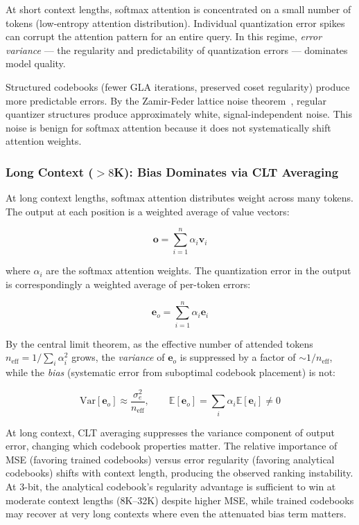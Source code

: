 \documentclass{article}
\newcommand{\E}{\mathbb{E}}
\newcommand{\Var}{\mathrm{Var}}
\begin{document}
At short context lengths, softmax attention is concentrated on a small number of
tokens (low-entropy attention distribution). Individual quantization error
spikes can corrupt the attention pattern for an entire query. In this regime,
\emph{error variance} — the regularity and predictability of quantization
errors — dominates model quality.

Structured codebooks (fewer GLA iterations, preserved coset regularity) produce
more predictable errors. By the Zamir-Feder lattice noise
theorem~\cite{zamir1996lattice}, regular quantizer structures produce
approximately white, signal-independent noise. This noise is benign for softmax
attention because it does not systematically shift attention weights.

\subsubsection{Long Context ($> 8$K): Bias Dominates via CLT Averaging}

At long context lengths, softmax attention distributes weight across many
tokens. The output at each position is a weighted average of value vectors:

\begin{equation}
\mathbf{o} = \sum_{i=1}^{n} \alpha_i \mathbf{v}_i
\end{equation}

where $\alpha_i$ are the softmax attention weights. The quantization error in
the output is correspondingly a weighted average of per-token errors:

\begin{equation}
\mathbf{e}_o = \sum_{i=1}^{n} \alpha_i \mathbf{e}_i
\end{equation}

By the central limit theorem, as the effective number of attended tokens
$n_{\text{eff}} = 1 / \sum_i \alpha_i^2$ grows, the \emph{variance} of
$\mathbf{e}_o$ is suppressed by a factor of $\sim 1/n_{\text{eff}}$, while
the \emph{bias} (systematic error from suboptimal codebook placement) is not:

\begin{equation}
\Var[\mathbf{e}_o] \approx \frac{\sigma_e^2}{n_{\text{eff}}}, \qquad
\E[\mathbf{e}_o] = \sum_i \alpha_i \E[\mathbf{e}_i] \neq 0
\end{equation}

At long context, CLT averaging suppresses the variance component of output
error, changing which codebook properties matter. The relative importance of
MSE (favoring trained codebooks) versus error regularity (favoring analytical
codebooks) shifts with context length, producing the observed ranking
instability. At 3-bit, the analytical codebook's regularity advantage is
sufficient to win at moderate context lengths (8K--32K) despite higher MSE,
while trained codebooks may recover at very long contexts where even the
attenuated bias term matters.
\end{document}
